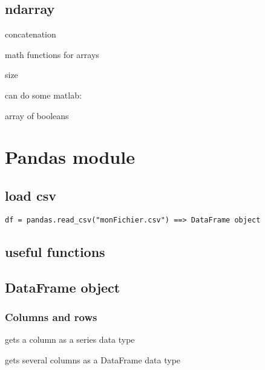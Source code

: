 	\subsection{ndarray}
		


		 concatenation

		 math functions for arrays


		 size

		can do some matlab:


		 array of booleans




\section{Pandas module}

	\subsection{load csv}

\begin{lstlisting}
df = pandas.read_csv("monFichier.csv") ==> DataFrame object
\end{lstlisting}

	\subsection{useful functions}
		

	\subsection{DataFrame object}

		\subsubsection{Columns and rows}
			
			 gets a column as a series data type

			 gets several columns as a DataFrame data type 

